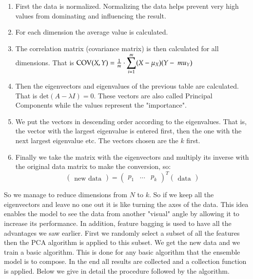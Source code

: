 \documentclass[a4paper,12pt]{report}
\theoremstyle{definitionNODot}
\begin{document}
	\begin{enumerate}
		\item First the data is normalized. Normalizing the data helps prevent very high values from dominating and influencing the result.
		\item For each dimension the average value is calculated.
		\item The correlation matrix (covariance matrix) is then calculated for all dimensions. That is $\text{COV}(X,Y) = \frac{1}{m} \cdot \mathlarger{\sum}\limits_{i=1}^{m}(X-\mu_X)(Y-\ mu_Y) $
		\item Then the eigenvectors and eigenvalues of the previous table are calculated. That is $\text{det}(A-\lambda I) = 0$. These vectors are also called Principal Components while the values represent the "importance".
		\item We put the vectors in descending order according to the eigenvalues. That is, the vector with the largest eigenvalue is entered first, then the one with the next largest eigenvalue etc. The vectors chosen are the $k$ first.
		\item Finally we take the matrix with the eigenvectors and multiply its inverse with the original data matrix to make the conversion, so:
		\[
		\begin{pmatrix}
			\text{new data}
		\end{pmatrix}
		=
		\begin{pmatrix}
			p_1 & ... & p_k
		\end{pmatrix} ^ T
		\begin{pmatrix}
			\text{data}
		\end{pmatrix}		
		\]
	\end{enumerate}
	So we manage to reduce dimensions from $ N $ to $ k $. So if we keep all the eigenvectors and leave no one out it is like turning the axes of the data. This idea enables the model to see the data from another "visual" angle by allowing it to increase its performance. In addition, feature bagging is used to have all the advantages we saw earlier. First we randomly select a subset of all the features then the PCA algorithm is applied to this subset. We get the new data and we train a basic algorithm. This is done for any basic algorithm that the ensemble model is to compose. In the end all results are collected and a collection function is applied. Below we give in detail the procedure followed by the algorithm.
	
\end{document}
